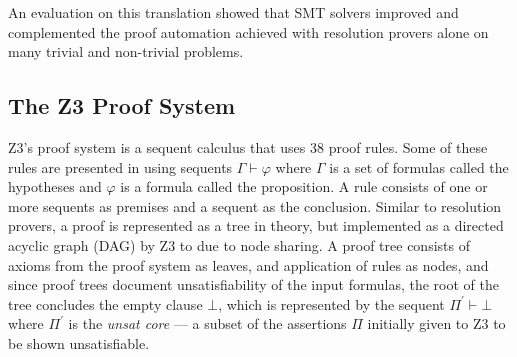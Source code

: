 \documentclass{article}
\begin{document}
		An evaluation on this translation showed that 
		SMT solvers improved and complemented the 
		proof automation achieved with resolution 
		provers alone on many trivial and non-trivial 
		problems.
		
	\subsection{The Z3 Proof System}
		Z3's proof system is a sequent calculus that uses 
		38 proof rules. Some of these rules are presented 
		in  using sequents 
		$\Gamma \vdash \varphi$ where $\Gamma$ is a set 
		of formulas called the hypotheses
		and $\varphi$ is a formula called the proposition. 
		A rule consists of one or more sequents as 
		premises and a sequent as the conclusion. 
		Similar to resolution provers, a proof is 
		represented as a tree in theory, but implemented 
		as a directed acyclic graph (DAG) by Z3 to 
		due to node sharing. A proof tree consists of axioms 
		from the proof system as leaves, and application 
		of rules as nodes, and since proof trees 
		document unsatisfiability of the input 
		formulas, the root of the tree concludes the 
		empty clause $\bot$, which is represented by 
		the sequent $\Pi^\prime \vdash \bot$ where 
		$\Pi^\prime$ is the \textit{unsat core} --- 
		a subset of the assertions $\Pi$
		initially given to Z3 to be shown unsatisfiable.
		
\end{document}
